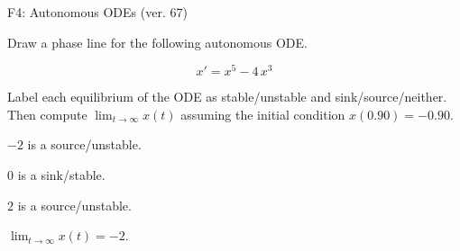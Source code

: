 \begin{exercise}
  \begin{exerciseTitle}F4: Autonomous ODEs (ver. 67)\end{exerciseTitle}
  \begin{exerciseStatement}
    

      Draw a phase line for the following 
      autonomous ODE.
    

    
\[x'= x^{5} - 4 \, x^{3}\]

    

      Label each equilibrium of the ODE
      as stable/unstable and sink/source/neither.
      Then compute \(\lim_{t\to\infty}x(t)\)
      assuming the initial condition
      \(x( 0.90 )= -0.90\).
    

  \end{exerciseStatement}
  \begin{exerciseAnswer}
    

      \(-2\) is a source/unstable.
      
        \(0\) is a sink/stable.
      
      \(2\) is a source/unstable.
    

    

      \(\lim_{t\to\infty}x(t)=-2\).
    

  \end{exerciseAnswer}
\end{exercise}